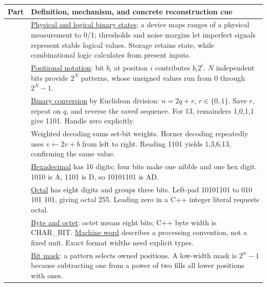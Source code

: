 {\def\LTcaptype{none} %
\begin{longtable}[]{@{}
  >{\raggedright\arraybackslash}p{}
  >{\raggedright\arraybackslash}p{}@{}}
\toprule\noalign{}
\begin{minipage}[b]{\linewidth}\raggedright
Part
\end{minipage} & \begin{minipage}[b]{\linewidth}\raggedright
Definition, mechanism, and concrete reconstruction cue
\end{minipage} \\
\midrule\noalign{}
\endhead
\bottomrule\noalign{}
\endlastfoot
1 & \hyperref[appendix-ea798b1ceb35]{Physical and logical binary states}: a device maps ranges of a physical measurement to 0/1; thresholds and noise margins let imperfect signals represent stable logical values. Storage retains state, while combinational logic calculates from present inputs. \\
2 & \hyperref[appendix-83c3f28f7bda]{Positional notation}: bit \(b_i\) at position \(i\) contributes \(b_i2^i\). \(N\) independent bits provide \(2^N\) patterns, whose unsigned values run from 0 through \(2^N-1\). \\
3 & \hyperref[appendix-dc552784a2c0]{Binary conversion} by Euclidean division: \(n=2q+r\), \(r\in\{0,1\}\). Save \(r\), repeat on \(q\), and reverse the saved sequence. For 13, remainders 1,0,1,1 give 1101. Handle zero explicitly. \\
4 & Weighted decoding sums set-bit weights. Horner decoding repeatedly uses \(v\leftarrow2v+b\) from left to right. Reading 1101 yields 1,3,6,13, confirming the same value. \\
5 & \hyperref[appendix-6b8075763724]{Hexadecimal} has 16 digits; four bits make one nibble and one hex digit. 1010 is A, 1101 is D, so 10101101 is AD. \\
6 & \hyperref[appendix-17fc1bc8b305]{Octal} has eight digits and groups three bits. Left-pad 10101101 to 010 101 101, giving octal 255. Leading zero in a C++ integer literal requests octal. \\
7 & \hyperref[appendix-5bee2df85484]{Byte and octet}: octet means eight bits; C++ byte width is CHAR\_BIT. \hyperref[appendix-d67a19507dc5]{Machine word} describes a processing convention, not a fixed unit. Exact format widths need explicit types. \\
8 & \hyperref[appendix-dbe5905163c2]{Bit mask}: a pattern selects owned positions. A low-width mask is \(2^w-1\) because subtracting one from a power of two fills all lower positions with ones. \\

\end{longtable}}
